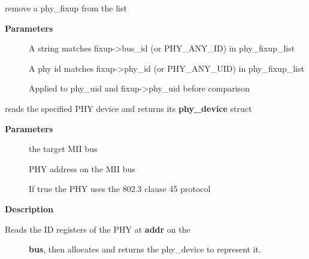 \documentclass[a4paper,8pt,english]{sphinxmanual}
\begin{document}
\begin{fulllineitems}
\label{networking/kapi:c.phy_unregister_fixup}
remove a phy\_fixup from the list

\end{fulllineitems}


\textbf{Parameters}
\begin{description}
\item[{}] \leavevmode
A string matches fixup-\textgreater{}bus\_id (or PHY\_ANY\_ID) in phy\_fixup\_list

\item[{}] \leavevmode
A phy id matches fixup-\textgreater{}phy\_id (or PHY\_ANY\_UID) in phy\_fixup\_list

\item[{}] \leavevmode
Applied to phy\_uid and fixup-\textgreater{}phy\_uid before comparison

\end{description}

\begin{fulllineitems}
\label{networking/kapi:c.get_phy_device}
reads the specified PHY device and returns its \textbf{phy\_device} struct

\end{fulllineitems}


\textbf{Parameters}
\begin{description}
\item[{}] \leavevmode
the target MII bus

\item[{}] \leavevmode
PHY address on the MII bus

\item[{}] \leavevmode
If true the PHY uses the 802.3 clause 45 protocol

\end{description}

\textbf{Description}
\begin{description}
\item[{Reads the ID registers of the PHY at \textbf{addr} on the}] \leavevmode
\textbf{bus}, then allocates and returns the phy\_device to represent it.

\end{description}
\end{document}

